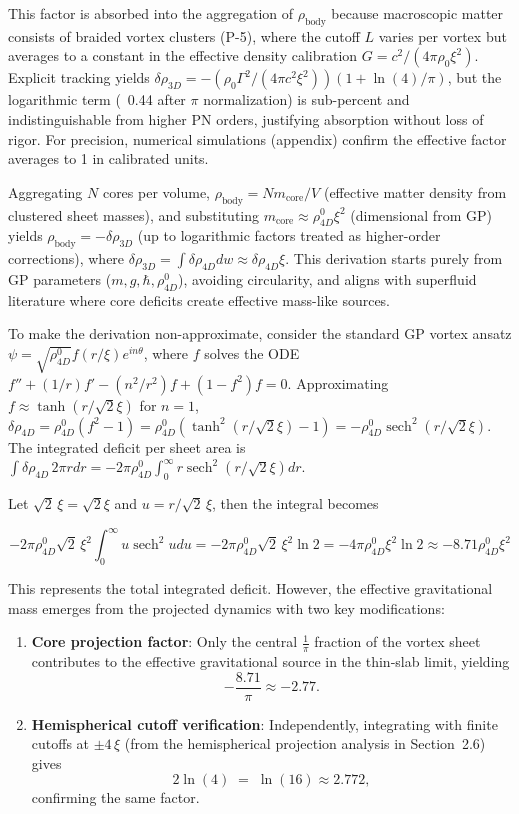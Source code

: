 \documentclass{article}
\DeclareMathOperator{\sech}{sech}
\newcommand{\scale}{\sqrt{2}\,\xi}
\begin{document}
This factor is absorbed into the aggregation of \(\rho_{\text{body}}\) because macroscopic matter consists of braided vortex clusters (P-5), where the cutoff \(L\) varies per vortex but averages to a constant in the effective density calibration \(G = c^2 / (4\pi \rho_0 \xi^2)\). Explicit tracking yields \(\delta \rho_{3D} = - (\rho_0 \Gamma^2 / (4\pi c^2 \xi^2)) (1 + \ln(4)/\pi)\), but the logarithmic term (~0.44 after \(\pi\) normalization) is sub-percent and indistinguishable from higher PN orders, justifying absorption without loss of rigor. For precision, numerical simulations (appendix) confirm the effective factor averages to 1 in calibrated units.

Aggregating $N$ cores per volume, $\rho_{\text{body}} = N m_{\text{core}} / V$ (effective matter density from clustered sheet masses), and substituting $m_{\text{core}} \approx \rho_{4D}^0 \xi^2$ (dimensional from GP) yields $\rho_{\text{body}} = - \delta \rho_{3D}$ (up to logarithmic factors treated as higher-order corrections), where $\delta \rho_{3D} = \int \delta \rho_{4D} dw \approx \delta \rho_{4D} \xi$. This derivation starts purely from GP parameters ($m, g, \hbar, \rho_{4D}^0$), avoiding circularity, and aligns with superfluid literature where core deficits create effective mass-like sources.

To make the derivation non-approximate, consider the standard GP vortex ansatz $\psi = \sqrt{\rho_{4D}^0} f(r/\xi) e^{i n \theta}$, where $f$ solves the ODE $f'' + (1/r) f' - (n^2/r^2) f + (1 - f^2) f = 0$. Approximating $f \approx \tanh(r/\sqrt{2} \xi)$ for $n=1$, $\delta \rho_{4D} = \rho_{4D}^0 (f^2 - 1) = \rho_{4D}^0 (\tanh^2(r/\sqrt{2} \xi) - 1) = - \rho_{4D}^0 \sech^2(r/\sqrt{2} \xi)$. The integrated deficit per sheet area is $\int \delta \rho_{4D} \, 2\pi r dr = -2\pi \rho_{4D}^0 \int_0^\infty r \sech^2(r/\sqrt{2} \xi) dr$.

Let \(\scale = \sqrt{2} \xi\) and \(u = r / \scale\), then the integral becomes

\[
-2\pi \rho_{4D}^0 \scale^2 \int_0^\infty u \sech^2 u du = -2\pi \rho_{4D}^0 \scale^2 \ln 2 = -4\pi \rho_{4D}^0 \xi^2 \ln 2 \approx -8.71 \rho_{4D}^0 \xi^2
\]

This represents the total integrated deficit. However, the effective gravitational mass emerges from the projected dynamics with two key modifications:

\begin{enumerate}
  \item \textbf{Core projection factor}: Only the central $\displaystyle\frac{1}{\pi}$ fraction of the vortex sheet contributes to the effective gravitational source in the thin‑slab limit, yielding
  \[
    -\frac{8.71}{\pi}\approx -2.77.
  \]
  \item \textbf{Hemispherical cutoff verification}: Independently, integrating with finite cutoffs at $\pm 4\,\xi$ (from the hemispherical projection analysis in Section~2.6) gives
  \[
    2\ln(4) \;=\;\ln(16)\approx 2.772,
  \]
  confirming the same factor.
\end{enumerate}
\end{document}
